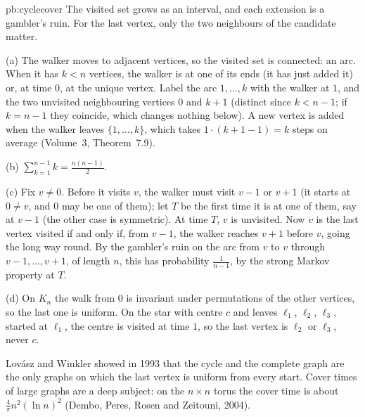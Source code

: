 \begin{solution}{pb:cyclecover}
\idea The visited set grows as an interval, and each extension is a gambler's ruin. For the last vertex, only the two neighbours of the
candidate matter.

\writeup (a) The walker moves to adjacent vertices, so the visited set is connected: an arc. When it has $k<n$ vertices, the walker is at one of its
ends (it has just added it) or, at time $0$, at the unique vertex. Label the arc $1,\dots,k$ with the walker at $1$, and the two unvisited
neighbouring vertices $0$ and $k+1$ (distinct since $k<n-1$; if $k=n-1$ they coincide, which changes nothing below). A new vertex is added when the
walker leaves $\{1,\dots,k\}$, which takes $1\cdot(k+1-1)=k$ steps on average (Volume~3, Theorem~7.9).

(b) $\sum_{k=1}^{n-1}k=\frac{n(n-1)}2$.

(c) Fix $v\ne0$. Before it visits $v$, the walker must visit $v-1$ or $v+1$ (it starts at $0\ne v$, and $0$ may be one of them); let $T$ be the first time it is at
one of them, say at $v-1$ (the other case is symmetric). At time $T$, $v$ is unvisited. Now $v$ is the last vertex visited if and only if, from $v-1$,
the walker reaches $v+1$ before $v$, going the long way round. By the gambler's ruin on the arc from $v$ to $v$ through $v-1,\dots,v+1$, of length $n$, this has
probability $\frac1{n-1}$, by the strong Markov property at $T$.

(d) On $K_n$ the walk from $0$ is invariant under permutations of the other vertices, so the last one is uniform. On the star with centre $c$ and leaves
$\ell_1$, $\ell_2$, $\ell_3$, started at $\ell_1$, the centre is visited at time $1$, so the last vertex is $\ell_2$ or $\ell_3$, never $c$.

\leads Lovász and Winkler showed in 1993 that the cycle and the complete graph are the only graphs on which the last vertex is uniform from every
start. Cover times of large graphs are a deep subject: on the $n\times n$ torus the cover time is about $\frac4\pi n^2(\ln n)^2$ (Dembo, Peres, Rosen and
Zeitouni, 2004).
\end{solution}

